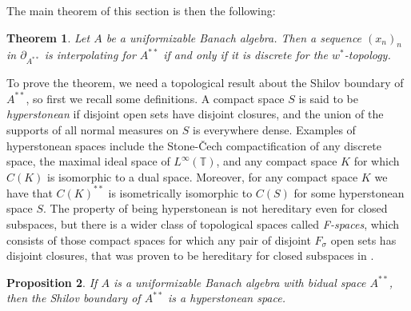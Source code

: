 \documentclass[preprint,12pt,number]{elsarticle}
\newtheorem{theorem}{Theorem}[section]
\newtheorem{proposition}[theorem]{Proposition}
\newcommand{\T}{\mathbb{T}}
\begin{document}
The main theorem of this section is then the following: 

\begin{theorem}\label{int-bid}
    Let $A$ be a uniformizable Banach algebra. Then a sequence $(x_n)_n$ in $\partial_{A^{**}}$ is interpolating for $A^{**}$ if and only if it is discrete for the $w^*$-topology.
\end{theorem}

To prove the theorem, we need a topological result about the Shilov boundary of $A^{**}$, so first we recall some definitions. A compact space $S$ is said to be \emph{hyperstonean} if disjoint open sets have disjoint closures, and the union of the supports of all normal measures on $S$ is everywhere dense. Examples of hyperstonean spaces include the Stone-\v{C}ech compactification of any discrete space, the maximal ideal space of $L^\infty(\T)$, and any compact space $K$ for which $C(K)$ is isomorphic to a dual space. Moreover, for any compact space $K$ we have that $C(K)^{**}$ is isometrically isomorphic to $C(S)$ for some hyperstonean space $S$. The property of being hyperstonean is not hereditary even for closed subspaces, but there is a wider class of topological spaces called \emph{F-spaces}, which consists of those compact spaces for which any pair of disjoint $F_\sigma$ open sets has disjoint closures, that was proven to be hereditary for closed subspaces in \cite{Seever1968}. 


\begin{proposition}\label{hyperstonean-bid}
    If $A$ is a uniformizable Banach algebra with bidual space $A^{**}$, then the Shilov boundary of $A^{**}$ is a hyperstonean space.
\end{proposition}
\end{document}
